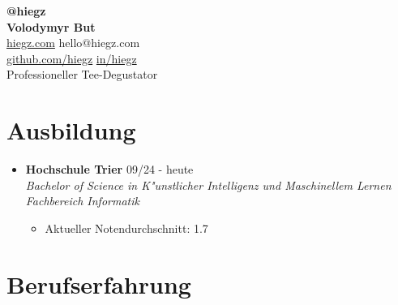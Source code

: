 \documentclass[]{article}
\begin{document}
\begin{center}
    \textbf{\Large @hiegz} \\[3pt]
    \textbf{\huge Volodymyr But} \\[7pt]

     \href{https://www.hiegz.com}{hiegz.com}
    \hspace{5pt}
     hello@hiegz.com \\[2pt]

     \href{https://github.com/hiegz}{github.com/hiegz}
    \hspace{5pt}
     \href{https://linkedin.com/in/hiegz}{in/hiegz} \\[10pt]

    Professioneller Tee-Degustator
\end{center}

\section{Ausbildung}

\begin{itemize}[leftmargin=0.15in, rightmargin=0.15in, label={}]
    \item {\large\bfseries Hochschule Trier} \hfill 09/24 - heute \\
        {\itshape Bachelor of Science in K"unstlicher Intelligenz und Maschinellem Lernen \\ Fachbereich Informatik}

        \begin{itemize}
            \item Aktueller Notendurchschnitt: 1.7
        \end{itemize}
\end{itemize}

\section{Berufserfahrung}
\end{document}
